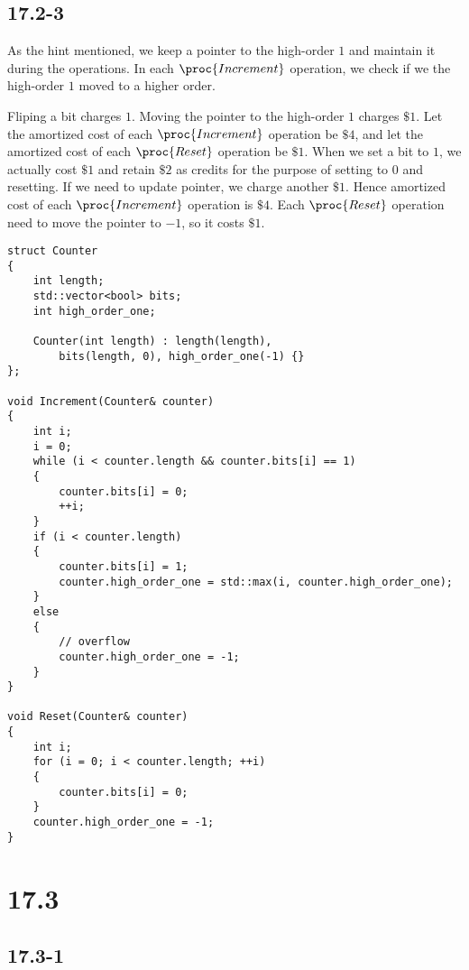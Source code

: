 \subsection*{17.2-3}

As the hint mentioned,
we keep a pointer to the high-order $1$
and maintain it during the operations.
In each $\proc{Increment}$ operation,
we check if we the high-order $1$ moved to a higher order.

Fliping a bit charges $1$.
Moving the pointer to the high-order $1$ charges $\$1$.
Let the amortized cost of each $\proc{Increment}$ operation be $\$4$,
and let the amortized cost of each $\proc{Reset}$ operation be $\$1$.
When we set a bit to $1$, we actually cost $\$1$ and retain $\$2$ as credits
for the purpose of setting to $0$ and resetting.
If we need to update pointer, we charge another $\$1$.
Hence amortized cost of each $\proc{Increment}$ operation is $\$4$.
Each $\proc{Reset}$ operation need to move the pointer to $-1$,
so it costs $\$1$.

\begin{verbatim}
struct Counter
{
    int length;
    std::vector<bool> bits;
    int high_order_one;

    Counter(int length) : length(length), 
        bits(length, 0), high_order_one(-1) {}
};

void Increment(Counter& counter)
{
    int i;
    i = 0;
    while (i < counter.length && counter.bits[i] == 1)
    {
        counter.bits[i] = 0;
        ++i;
    }
    if (i < counter.length)
    {
        counter.bits[i] = 1;
        counter.high_order_one = std::max(i, counter.high_order_one);
    }
    else
    {
        // overflow
        counter.high_order_one = -1;
    }
}

void Reset(Counter& counter)
{
    int i;
    for (i = 0; i < counter.length; ++i)
    {
        counter.bits[i] = 0;
    }
    counter.high_order_one = -1;
}
\end{verbatim}

\section*{17.3}

\subsection*{17.3-1}

